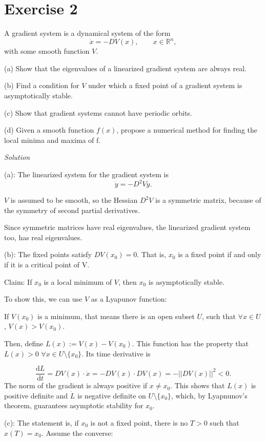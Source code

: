 \documentclass[a4paper,11pt,pdftex]{article}
\begin{document}
\section*{Exercise 2}
A gradient system is a dynamical system of the form 
$$
\dot{x} = -DV(x), \qquad x\in \mathbb{R}^{n},
$$
with some smooth function $V$. 

(a) Show that the eigenvalues of a linearized gradient system are always real.

(b) Find a condition for $V$ under which a fixed point of a gradient system is asymptotically stable.

(c) Show that gradient systems cannot have periodic orbits.

(d) Given a smooth function $f(x)$, propose a numerical method for finding the local minima and maxima of f. 

\emph{Solution}

(a): The linearized system for the gradient system is 
$$
\dot{y} = -D^2Vy.
$$

$V$ is assumed to be smooth, so the Hessian $D^2V$ is a symmetric matrix, because of the symmetry of second partial derivatives. 

Since symmetric matrices have real eigenvalues, the linearized gradient system too, has real eigenvalues.

(b): The fixed points satisfy $DV(x_0) = 0$.
That is, $x_0$ is a fixed point if and only if it is a critical point of V. 

Claim: If $x_0$ is a local minimum of $V$, then $x_0$ is asymptotically stable.

To show this, we can use $V$ as a Lyapunov function:

If $V(x_0)$ is a minimum, that means there is an open subset $U$, such that 
$\forall x\in U$, $V(x)>V(x_0)$.

Then, define $L(x):= V(x)-V(x_0)$. This function has the property that $L(x)>0$ $\forall x\in U\setminus \{x_0\}$. Its time derivative is

$$
\frac{\text{d}L}{\text{d}t} = DV(x)\cdot \dot{x} = -DV(x)\cdot DV(x) = - ||DV(x)||^2 < 0.
$$
The norm of the gradient is always positive if $x\ne x_0$. 
This shows that $L(x)$ is positive definite and $\dot{L}$ is negative definite  on $U\setminus \{x_0\}$, which, by Lyapnunov's theorem, guarantees asymptotic stability for $x_0$.

(c): The statement is, if $x_0$ is not a fixed point, there is no $T>0$ such that $x(T) = x_0$. Assume the converse: 
\end{document}
